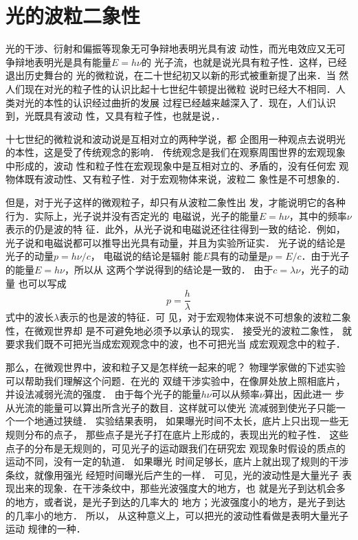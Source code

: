 \section{光的波粒二象性}
光的干涉、衍射和偏振等现象无可争辩地表明光具有波
动性，而光电效应又无可争辩地表明光是具有能量$E=h\nu$的
光子流，也就是说光具有粒子性．这样，已经退出历史舞台的
光的微粒说，在二十世纪初又以新的形式被重新提了出来．当
然人们现在对光的粒子性的认识比起十七世纪牛顿提出微粒
说时已经大不相同．人类对光的本性的认识经过曲折的发展
过程已经越来越深入了．现在，人们认识到，光既具有波动
性，又具有粒子性，也就是说，．

十七世纪的微粒说和波动说是互相对立的两种学说，都
企图用一种观点去说明光的本性，这是受了传统观念的影响．
传统观念是我们在观察周围世界的宏观现象中形成的，波动
性和粒子性在宏观现象中是互相对立的、矛盾的，没有任何宏
观物体既有波动性、又有粒子性．对于宏观物体来说，波粒二
象性是不可想象的．

但是，对于光子这样的微观粒子，却只有从波粒二象性出
发，才能说明它的各种行为．实际上，光子说并没有否定光的
电磁说，光子的能量$E=h\nu$，其中的频率$\nu$表示的仍是波的特
征．此外，从光子说和电磁说还往往得到一致的结论．例如，
光子说和电磁说都可以推导出光具有动量，并且为实验所证实．
光子说的结论是光子的动量$p=h\nu/c$，
电磁说的结论是辐射
能$E$具有的动量是$p=E/c$．由于光子的能量$E=h\nu$，所以从
这两个学说得到的结论是一致的．
由于$c=\lambda\nu$，光子的动量
也可以写成
$$p=\frac{h}{\lambda}$$
式中的波长$\lambda$表示的也是波的特征．可
见，对于宏观物体来说不可想象的波粒二象性，在微观世界却
是不可避免地必须予以承认的现实．
接受光的波粒二象性，
就要求我们既不可把光当成宏观观念中的波，也不可把光当
成宏观观念中的粒子．

那么，在微观世界中，波和粒子又是怎样统一起来的呢？
物理学家做的下述实验可以帮助我们理解这个问题．在光的
双缝干涉实验中，在像屏处放上照相底片，并设法减弱光流的强度．
由于每个光子的能量$h\nu$可以从频率$\nu$算出，因此进一
步从光流的能量可以算出所含光子的数目．这样就可以使光
流减弱到使光子只能一个一个地通过狭缝．
实验结果表明，
如果曝光时间不太长，底片上只出现一些无规则分布的点子，
那些点子是光子打在底片上形成的，表现出光的粒子性．
这些点子的分布是无规则的，可见光子的运动跟我们在研究宏
观现象时假设的质点的运动不同，没有一定的轨道．
如果曝光
时间足够长，底片上就出现了规则的干涉条纹，就像用强光
经短时间曝光后产生的一样．
可见，光的波动性是大量光子
表现出来的现象．在干涉条纹中，那些光波强度大的地方，也
就是光子到达机会多的地方，或者说，是光子到达的几率大的
地方；光波强度小的地方，是光子到达的几率小的地方．
所以，
从这种意义上，可以把光的波动性看做是表明大量光子运动
规律的一种．

